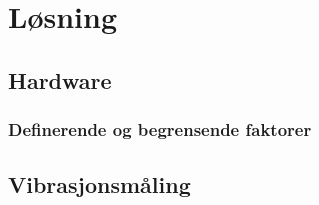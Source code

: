 \chapter{Løsning}

\section{Hardware}
\subsection{Definerende og begrensende faktorer}
\section{Vibrasjonsmåling}
